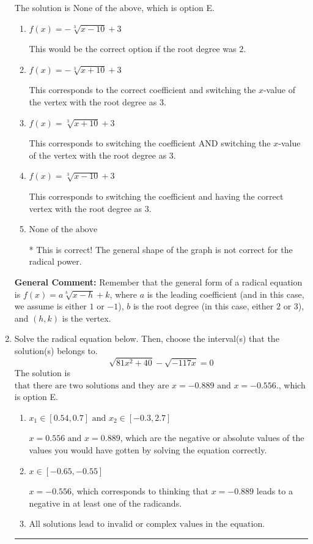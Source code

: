 \documentclass{extbook}[14pt]
\newcommand{\litem}[1]{\item #1

\rule{\textwidth}{0.4pt}}
\begin{document}
\begin{enumerate}
{The solution is \( \text{None of the above} \), which is option E.\begin{enumerate}[label=\Alph*.]
\item \( f(x) = - \sqrt[3]{x - 10} + 3 \)

This would be the correct option if the root degree was $2$.
\item \( f(x) = - \sqrt[3]{x + 10} + 3 \)

This corresponds to the correct coefficient and switching the $x$-value of the vertex with the root degree as $3$.
\item \( f(x) = \sqrt[3]{x + 10} + 3 \)

This corresponds to switching the coefficient AND switching the $x$-value of the vertex with the root degree as $3$.
\item \( f(x) = \sqrt[3]{x - 10} + 3 \)

This corresponds to switching the coefficient and having the correct vertex with the root degree as $3$.
\item \( \text{None of the above} \)

* This is correct! The general shape of the graph is not correct for the radical power.
\end{enumerate}

\textbf{General Comment:} Remember that the general form of a radical equation is $ f(x) = a \sqrt[b]{x - h} + k$, where $a$ is the leading coefficient (and in this case, we assume is either $1$ or $-1$), $b$ is the root degree (in this case, either $2$ or $3$), and $(h, k)$ is the vertex.
}
\litem{
Solve the radical equation below. Then, choose the interval(s) that the solution(s) belongs to.
\[ \sqrt{81 x^2 + 40} - \sqrt{-117 x} = 0 \]
The solution is \( \text{that there are two solutions and they are } x = -0.889 \text{ and } x = -0.556. \), which is option E.\begin{enumerate}[label=\Alph*.]
\item \( x_1 \in [0.54, 0.7] \text{ and } x_2 \in [-0.3,2.7] \)

$x = 0.556 \text{ and } x = 0.889$, which are the negative or absolute values of the values you would have gotten by solving the equation correctly.
\item \( x \in [-0.65,-0.55] \)

$x = -0.556$, which corresponds to thinking that $x = -0.889$ leads to a negative in at least one of the radicands.
\item \( \text{All solutions lead to invalid or complex values in the equation.} \)


\end{enumerate}}
\end{enumerate}
\end{document}
